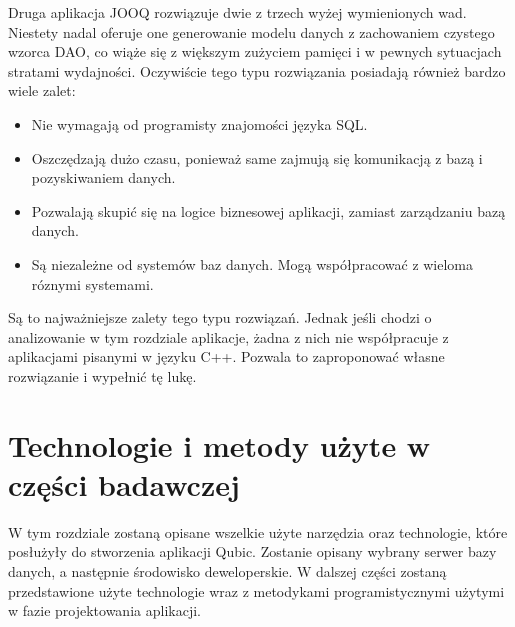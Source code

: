 \documentclass[12pt]{report}
\begin{document}
Druga aplikacja JOOQ rozwiązuje dwie z trzech wyżej wymienionych wad. Niestety nadal oferuje one generowanie modelu danych z zachowaniem czystego wzorca DAO, co wiąże się z większym zużyciem pamięci i w pewnych sytuacjach stratami wydajności. Oczywiście tego typu rozwiązania posiadają również bardzo wiele zalet:
	
\begin{itemize}
\item{Nie wymagają od programisty znajomości języka SQL.}
\item{Oszczędzają dużo czasu, ponieważ same zajmują się komunikacją z bazą i pozyskiwaniem danych.}
\item{Pozwalają skupić się na logice biznesowej aplikacji, zamiast zarządzaniu bazą danych.}
\item{Są niezależne od systemów baz danych. Mogą współpracować z wieloma róznymi systemami.}
\end{itemize}

Są to najważniejsze zalety tego typu rozwiązań. Jednak jeśli chodzi o analizowanie w tym rozdziale aplikacje, żadna z nich nie współpracuje z aplikacjami pisanymi w języku C++. Pozwala to zaproponować własne rozwiązanie i wypełnić tę lukę.
\chapter{Technologie i metody użyte w części badawczej}\label{chap:technologie}
W tym rozdziale zostaną opisane wszelkie użyte narzędzia oraz technologie, które posłużyły do stworzenia aplikacji Qubic. Zostanie opisany wybrany serwer bazy danych, a następnie środowisko deweloperskie. W dalszej części zostaną przedstawione użyte technologie wraz z metodykami programistycznymi użytymi w fazie projektowania aplikacji. 
\end{document}
